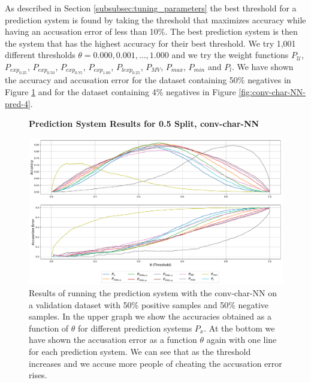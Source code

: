 As described in Section \ref{subsubsec:tuning_parameters} the best threshold
for a prediction system is found by taking the threshold that maximizes
accuracy while having an accusation error of less than 10\%. The best
prediction system is then the system that has the highest accuracy for
their best threshold. We try 1,001 different thresholds $\theta = 0.000,
0.001, \dots, 1.000$ and we try the weight functions $P_\mathcal{U}$,
$P_{exp_{0.25}}$, $P_{exp_{0.50}}$, $P_{exp_{0.75}}$, $P_{exp_{1.00}}$,
$P_{lexp_{0.25}}$, $P_{MV}$, $P_{max}$, $P_{min}$ and $P_l$. We have shown
the accuracy and accusation error for the dataset containing 50\% negatives
in Figure \ref{fig:conv-char-NN-pred-50} and for the dataset containing 4\%
negatives in Figure \ref{fig:conv-char-NN-pred-4}.

\begin{figure}
    \centering
    \textbf{Prediction System Results for 0.5 Split, \gls{conv-char-NN}}\par\medskip
    \includegraphics[scale=0.33]{./pictures/experiments/conv_char_nn/prediction_system_50}
    \caption{Results of running the prediction system with the
        \gls{conv-char-NN} on a validation dataset with 50\% positive samples
        and 50\% negative samples. In the upper graph we show the accuracies
        obtained as a function of $\theta$ for different prediction systems
        $P_x$. At the bottom we have shown the accusation error as a function
        $\theta$ again with one line for each prediction system. We can see that
        as the threshold increases and we accuse more people of cheating the
        accusation error rises.}
    \label{fig:conv-char-NN-pred-50}
\end{figure}

